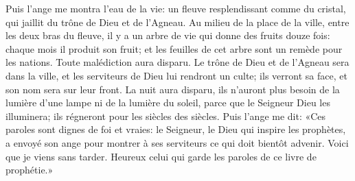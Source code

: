 Puis l’ange me montra l’eau de la vie:
	un fleuve resplendissant comme du cristal,
	qui jaillit du trône de Dieu et de l’Agneau.
Au milieu de la place de la ville, entre les deux bras du fleuve,
	il y a un arbre de vie qui donne des fruits douze fois:
	chaque mois il produit son fruit;
	et les feuilles de cet arbre sont un remède pour les nations.
Toute malédiction aura disparu.
	Le trône de Dieu et de l’Agneau sera dans la ville,
	et les serviteurs de Dieu lui rendront un culte;
	ils verront sa face, et son nom sera sur leur front.
La nuit aura disparu,
	ils n’auront plus besoin de la lumière d’une lampe
		ni de la lumière du soleil,
	parce que le Seigneur Dieu les illuminera;
	ils régneront pour les siècles des siècles.
Puis l’ange me dit:
	«Ces paroles sont dignes de foi et vraies:
	le Seigneur, le Dieu qui inspire les prophètes,
	a envoyé son ange pour montrer à ses serviteurs ce qui doit bientôt advenir.
Voici que je viens sans tarder.
	Heureux celui qui garde les paroles de ce livre de prophétie.»

